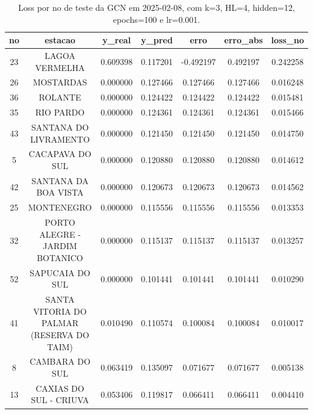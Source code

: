 \begin{table}[h]
\centering
\caption{Loss por no de teste da GCN em 2025-02-08, com k=3, HL=4, hidden=12, epochs=100 e lr=0.001.}
\label{tab:gcn_loss_k3_hl4_h12_e100_d20250208}
\begin{tabular}{ccccccc}
\toprule
no & estacao & y\_real & y\_pred & erro & erro\_abs & loss\_no \\
\midrule
23 & LAGOA VERMELHA & 0.609398 & 0.117201 & -0.492197 & 0.492197 & 0.242258 \\
26 & MOSTARDAS & 0.000000 & 0.127466 & 0.127466 & 0.127466 & 0.016248 \\
36 & ROLANTE & 0.000000 & 0.124422 & 0.124422 & 0.124422 & 0.015481 \\
35 & RIO PARDO & 0.000000 & 0.124361 & 0.124361 & 0.124361 & 0.015466 \\
43 & SANTANA DO LIVRAMENTO & 0.000000 & 0.121450 & 0.121450 & 0.121450 & 0.014750 \\
5 & CACAPAVA DO SUL & 0.000000 & 0.120880 & 0.120880 & 0.120880 & 0.014612 \\
42 & SANTANA DA BOA VISTA & 0.000000 & 0.120673 & 0.120673 & 0.120673 & 0.014562 \\
25 & MONTENEGRO & 0.000000 & 0.115556 & 0.115556 & 0.115556 & 0.013353 \\
32 & PORTO ALEGRE - JARDIM BOTANICO & 0.000000 & 0.115137 & 0.115137 & 0.115137 & 0.013257 \\
52 & SAPUCAIA DO SUL & 0.000000 & 0.101441 & 0.101441 & 0.101441 & 0.010290 \\
41 & SANTA VITORIA DO PALMAR (RESERVA DO TAIM) & 0.010490 & 0.110574 & 0.100084 & 0.100084 & 0.010017 \\
8 & CAMBARA DO SUL & 0.063419 & 0.135097 & 0.071677 & 0.071677 & 0.005138 \\
13 & CAXIAS DO SUL - CRIUVA & 0.053406 & 0.119817 & 0.066411 & 0.066411 & 0.004410 \\
\bottomrule
\end{tabular}
\end{table}
